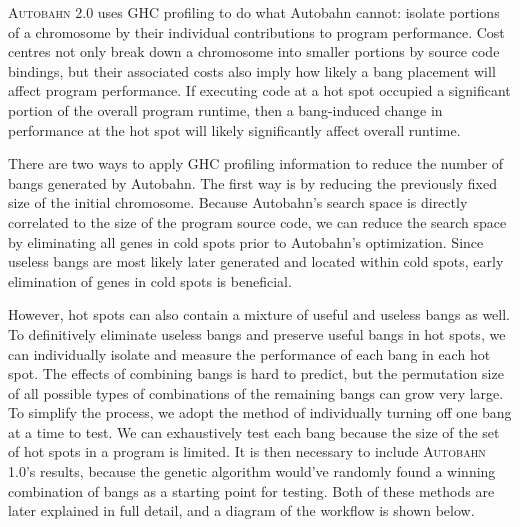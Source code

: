 \documentclass[format=sigplan, review=true]{acmart}
\newcommand{\hotspot}[0]{hot spot}
\newcommand{\hotspots}[0]{hot spots}
\newcommand{\coldspots}[0]{cold spots}
\newcommand{\useful}[0]{useful}
\newcommand{\useless}[0]{useless}
\newcommand{\Ao}[0]{\textsc{Autobahn 1.0}}
\newcommand{\At}[0]{\textsc{Autobahn 2.0}}
\begin{document}
\At{} uses GHC profiling to do what Autobahn cannot: isolate portions of a chromosome by their individual contributions to program performance. Cost centres not only break down a chromosome into smaller portions by source code bindings, but their associated costs also imply how likely a bang placement will affect program performance. If executing code at a \hotspot{} occupied a significant portion of the overall program runtime, then a bang-induced change in performance at the \hotspot{} will likely significantly affect overall runtime. 

There are two ways to apply GHC profiling information to reduce the number of bangs generated by Autobahn. The first way is by reducing the previously fixed size of the initial chromosome. Because Autobahn's search space is directly correlated to the size of the program source code, we can reduce the search space by eliminating all genes in \coldspots{} prior to Autobahn's optimization. Since \useless{} bangs are most likely later generated and located within \coldspots{}, early elimination of genes in \coldspots{} is beneficial. 

However, \hotspots{} can also contain a mixture of \useful{} and \useless{} bangs as well. To definitively eliminate \useless{} bangs and preserve \useful{} bangs in \hotspots{}, we can individually isolate and measure the performance of each bang in each \hotspot{}. The effects of combining bangs is hard to predict, but the permutation size of all possible types of combinations of the remaining bangs can grow very large. To simplify the process, we adopt the method of individually turning off one bang at a time to test. We can exhaustively test each bang because the size of the set of \hotspots{} in a program is limited. It is then necessary to include \Ao{}'s results, because the genetic algorithm would've randomly found a winning combination of bangs as a starting point for testing. Both of these methods are later explained in full detail, and a diagram of the workflow is shown below.

\end{document}
